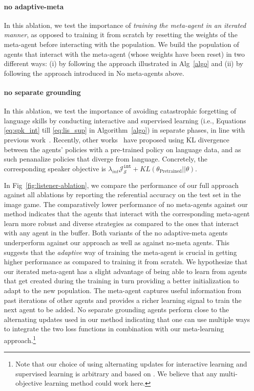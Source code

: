 \documentclass{article}
\begin{document}
\paragraph{no adaptive-meta} In this ablation, we test the importance of \textit{training the meta-agent in an iterated manner}, as opposed to training it from scratch by resetting the weights of the meta-agent before interacting with the population.
We build the population of agents that interact with the meta-agent (whose weights have been reset) in two different ways: (i) by following the approach illustrated in Alg~\ref{algo} and (ii) by following the approach introduced in No meta-agents above. 
\paragraph{no separate grounding} In this ablation, we test the importance of avoiding catastrophic forgetting of language skills by conducting interactive and supervised learning (i.e., Equations \ref{eq:spk_int} till \ref{eq:lis_sup} in Algorithm~\ref{algo}) in separate phases, in line with previous work~\citep{lowe*2020on}. Recently, other works~\citep{lazaridou-etal-2020-multi,DBLP:journals/corr/abs-2003-12694} have proposed using KL divergence between the agents' policies with a pre-trained policy on language data, and as such penanalize policies that diverge from language. Concretely, the corresponding speaker objective is $\lambda_{int} \mathcal{J}^\texttt{int}_{\mathcal{S}} + KL(\theta_{\text{Pretrained}} || \theta)$.

In Fig~\ref{fig:listener-ablation}, we compare the performance of our full approach against all ablations by reporting the referential accuracy on the test set in the image game. The comparatively lower performance of no meta-agents against our method indicates that the agents that interact with the corresponding meta-agent learn more robust and diverse strategies as compared to the ones that interact with any agent in the buffer. Both variants of the no adaptive-meta agents underperform against our approach as well as against no-meta agents. This suggests that the \textit{adaptive} way of training the meta-agent is crucial in getting higher performance as compared to training it from scratch. We hypothesize that our iterated meta-agent has a slight advantage of being able to learn from agents that get created during the training in turn providing a better initialization to adapt to the new population. The meta-agent captures useful information from past iterations of other agents and provides a richer learning signal to train the next agent to be added. No separate grounding agents perform close to the alternating updates used in our method indicating that one can use multiple ways to integrate the two loss functions in combination with our meta-learning approach.\footnote{Note that our choice of using alternating updates for interactive learning and supervised learning is arbitrary and based on \citep{lowe*2020on}. We believe that any multi-objective learning method could work here.} 
\end{document}
